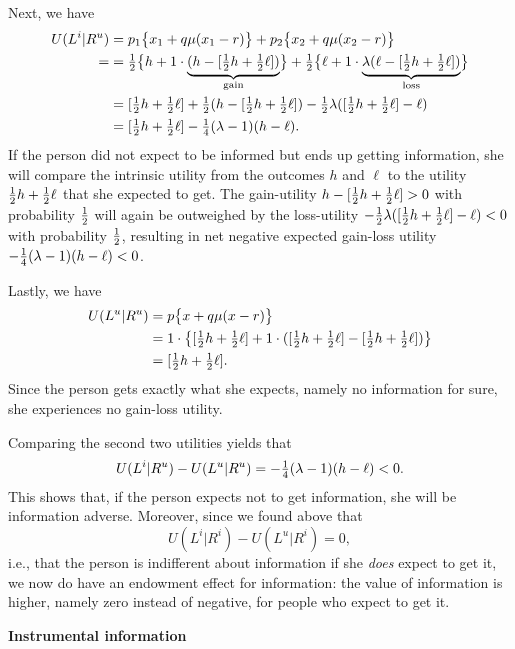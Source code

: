 Next, we have
\begin{align*}
  U(L^i|R^u)
&= p_1\bigl\{x_1 + q\mu(x_1 - r)\bigr\}
 + p_2\bigl\{x_2 + q\mu(x_2 - r)\bigr\}\\=
&= \tfrac{1}{2}\bigl\{h +
 1\cdot\underbrace{(h - [\tfrac{1}{2} h + \tfrac{1}{2}\ell])}_{\text{gain}}\bigr\}
 + \tfrac{1}{2}\bigl\{\ell + 1\cdot\underbrace{\lambda(\ell - [\tfrac{1}{2} h + \tfrac{1}{2}\ell])}_{\text{loss}}\bigr\}\\
&= [\tfrac{1}{2} h + \tfrac{1}{2} \ell] +
\tfrac{1}{2}(h-[\tfrac{1}{2} h + \tfrac{1}{2} \ell]) - \tfrac{1}{2} \lambda([\tfrac{1}{2} h + \tfrac{1}{2}\ell] - \ell)\\
&= [\tfrac{1}{2} h + \tfrac{1}{2} \ell] - \tfrac{1}{4}(\lambda-1)(h - \ell).
\end{align*}
If the person did not expect to be informed but ends up getting information,
she will compare the intrinsic utility from the outcomes $h$ and $\ell$ to the
utility $\tfrac{1}{2} h + \tfrac{1}{2} \ell$ that she expected to get. The gain-utility $h -
[\tfrac{1}{2} h + \tfrac{1}{2} \ell]>0$ with probability $\tfrac{1}{2}$ will again be outweighed by
the loss-utility $ - \tfrac{1}{2} \lambda([\tfrac{1}{2} h + \tfrac{1}{2}\ell] - \ell)<0$ with
probability $\tfrac{1}{2}$, resulting in net negative expected gain-loss utility
$-\tfrac{1}{4}(\lambda - 1)(h - \ell) < 0$.

Lastly, we have
\begin{align*}
  U(L^u|R^u)
&= p\bigl\{x + q\mu(x - r)\bigr\}
\\
&= 1\cdot\bigl\{[\tfrac{1}{2} h + \tfrac{1}{2} \ell] + 1\cdot([\tfrac{1}{2} h + \tfrac{1}{2} \ell] - [\tfrac{1}{2}
h + \tfrac{1}{2} \ell])\bigr\}\\
&= [\tfrac{1}{2} h + \tfrac{1}{2} \ell].
\end{align*}
Since the person gets exactly what she expects, namely no information for
sure, she experiences no gain-loss utility.

Comparing the second two utilities yields that
\begin{equation*}
  U(L^i|R^u) - U(L^u|R^u) = -\tfrac{1}{4}(\lambda-1)(h-\ell) < 0.
\end{equation*}
This shows that, if the person expects not to get information, she will be
information adverse. Moreover, since we found above that
\begin{equation*}
  U(L^i|R^i) - U(L^u|R^i) = 0,
\end{equation*}
i.e., that the person is indifferent about information if she {\em does} expect
to get it, we now do have an endowment effect for information: the value of
information is higher, namely zero instead of negative, for people who expect
to get it.

\begin{center}
\textbf{Instrumental information}
\end{center}

